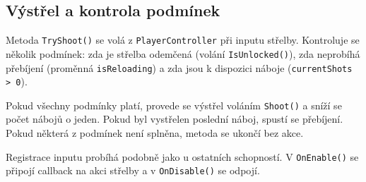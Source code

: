\subsection{Výstřel a kontrola podmínek}

Metoda \texttt{TryShoot()} se volá z \texttt{PlayerController} při inputu střelby. Kontroluje se několik podmínek: zda je střelba odemčená (volání \texttt{IsUnlocked()}), zda neprobíhá přebíjení (proměnná \texttt{isReloading}) a zda jsou k dispozici náboje (\texttt{currentShots > 0}).

Pokud všechny podmínky platí, provede se výstřel voláním \texttt{Shoot()} a sníží se počet nábojů o jeden. Pokud byl vystřelen poslední náboj, spustí se přebíjení. Pokud některá z podmínek není splněna, metoda se ukončí bez akce.

Registrace inputu probíhá podobně jako u ostatních schopností. V \texttt{OnEnable()} se připojí callback na akci střelby a v \texttt{OnDisable()} se odpojí.
